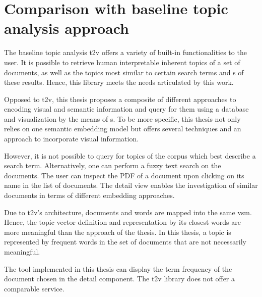 \section{Comparison with baseline topic analysis approach}\label{sec:evaluation-top-model-app}

The baseline topic analysis \ac{t2v} offers a variety of built-in functionalities to the user.
It is possible to retrieve human interpretable inherent topics of a set of documents, 
as well as the topics most similar to certain search terms 
and \wordcloud{}s of these results.
Hence, this library meets the needs articulated by this work.

Opposed to \ac{t2v}, this thesis proposes a composite of different approaches to encoding visual and semantic information 
and query for them using a database and visualization by the means of \wordcloud{}s.
To be more specific, this thesis not only relies on one semantic embedding model but offers several techniques and an approach to incorporate visual information.

However, it is not possible to query for topics of the corpus which best describe a search term.
Alternatively, one can perform a fuzzy text search on the documents.
The user can inspect the PDF of a document upon clicking on its name in the list of documents.
The detail view enables the investigation of similar documents in terms of different embedding approaches.

Due to \ac{t2v}'s architecture, documents and words are mapped into the same \ac{vsm}.
Hence, the topic vector definition and representation by its closest words are more meaningful than the approach of the thesis. 
In this thesis, a topic is represented by frequent words in the set of documents that are not necessarily meaningful. 

The tool implemented in this thesis can display the term frequency of the document chosen in the detail component.
The \ac{t2v} library does not offer a comparable service.